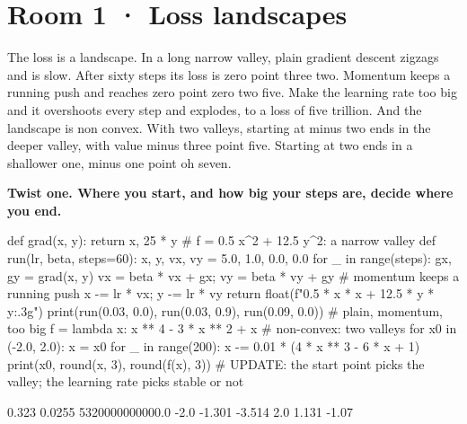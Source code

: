 \documentclass[11pt,a4paper]{report}
\begin{document}
\section*{Room 1 · Loss landscapes}
The loss is a landscape. In a long narrow valley, plain gradient descent zigzags and is slow. After sixty steps its loss is zero point three two. Momentum keeps a running push and reaches zero point zero two five. Make the learning rate too big and it overshoots every step and explodes, to a loss of five trillion. And the landscape is non convex. With two valleys, starting at minus two ends in the deeper valley, with value minus three point five. Starting at two ends in a shallower one, minus one point oh seven.
\begin{tcolorbox}[colback=yellow!12,colframe=orange!70!black,boxrule=0.4pt,left=4pt,right=4pt,top=2pt,bottom=2pt]\textbf{Twist one. Where you start, and how big your steps are, decide where you end.}\end{tcolorbox}
\begin{Code}
def grad(x, y): return x, 25 * y            # f = 0.5 x^2 + 12.5 y^2: a narrow valley
def run(lr, beta, steps=60):
    x, y, vx, vy = 5.0, 1.0, 0.0, 0.0
    for _ in range(steps):
        gx, gy = grad(x, y)
        vx = beta * vx + gx; vy = beta * vy + gy    # momentum keeps a running push
        x -= lr * vx; y -= lr * vy
    return float(f"{0.5 * x * x + 12.5 * y * y:.3g}")
print(run(0.03, 0.0), run(0.03, 0.9), run(0.09, 0.0))   # plain, momentum, too big
f = lambda x: x ** 4 - 3 * x ** 2 + x       # non-convex: two valleys
for x0 in (-2.0, 2.0):
    x = x0
    for _ in range(200): x -= 0.01 * (4 * x ** 3 - 6 * x + 1)
    print(x0, round(x, 3), round(f(x), 3))
# UPDATE: the start point picks the valley; the learning rate picks stable or not
\end{Code}
\begin{Out}
0.323 0.0255 5320000000000.0
-2.0 -1.301 -3.514
2.0 1.131 -1.07
\end{Out}
\end{document}
